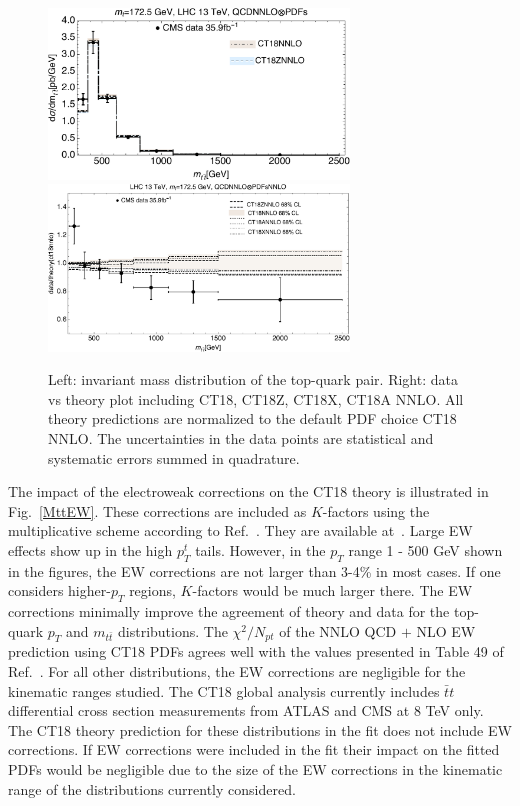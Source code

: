 \begin{figure}[p]
\begin{center}
\includegraphics[width=8cm]{./fig/ttbar/CMS13-mtt-CT18NNLO-mt172p5_ect.pdf}
\includegraphics[width=8cm]{./fig/ttbar/CMS13-mtt-top-nnlo-ct18-zaxnnlo-mt172p5_ect.pdf}
\caption{Left: invariant mass distribution of the top-quark pair. 
Right: data vs theory plot including CT18, CT18Z, CT18X, CT18A NNLO. All theory predictions are normalized to the default PDF choice CT18 NNLO.
The uncertainties in the data points are statistical and systematic errors summed in quadrature.}
\label{Mtt}
\end{center}
\end{figure}

%
The impact of the electroweak corrections on the CT18 theory is illustrated in Fig.~\ref{MttEW}. These corrections are included as $K$-factors using the multiplicative scheme according to Ref.~\cite{Czakon:2017wor}. They are available at~\cite{EW:kfac}. Large EW effects show up in the high $p_{T}^t$ tails. 
However, in the $p_T$ range 1 - 500 GeV shown in the figures, 
the EW corrections are not larger than 3-4\% in most cases. 
If one considers higher-$p_T$ regions, $K$-factors would be much larger there.
The EW corrections minimally improve the agreement of theory and data for the
top-quark $p_T$ and $m_{t\bar{t}}$ distributions. 
The $\chi^2/N_{pt}$ of the NNLO QCD $+$ NLO EW prediction using CT18 PDFs agrees well with the values presented in Table 49 of Ref.~\cite{Sirunyan:2018ucr}. 
For all other distributions, the EW corrections are negligible for the kinematic ranges studied.
The CT18 global analysis currently includes $\bar{t}t$ differential cross section measurements from ATLAS and CMS at 8 TeV only. The CT18 theory prediction for these distributions in the fit does not include EW corrections. If EW corrections were included in the fit their impact on the fitted PDFs would be negligible due to the size of the EW corrections in the kinematic range of the distributions currently considered. 

